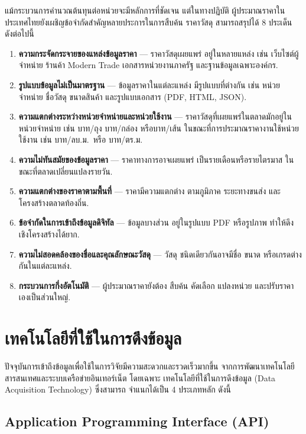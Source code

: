 แม้กระบวนการคำนวณต้นทุนต่อหน่วยจะมีหลักการที่ชัดเจน แต่ในทางปฏิบัติ
ผู้ประมาณราคาในประเทศไทยยังเผชิญข้อจำกัดสำคัญหลายประการในการสืบค้น
ราคาวัสดุ \cite{benchanakatkun2014,elmohr2022} สามารถสรุปได้ 8 ประเด็น
ดังต่อไปนี้

\begin{enumerate}[leftmargin=2em,itemsep=0.3em]
  \item \textbf{ความกระจัดกระจายของแหล่งข้อมูลราคา} --- ราคาวัสดุเผยแพร่
        อยู่ในหลายแหล่ง เช่น เว็บไซต์ผู้จำหน่าย ร้านค้า Modern Trade
        เอกสารหน่วยงานภาครัฐ และฐานข้อมูลเฉพาะองค์กร.
  \item \textbf{รูปแบบข้อมูลไม่เป็นมาตรฐาน} --- ข้อมูลราคาในแต่ละแหล่ง
        มีรูปแบบที่ต่างกัน เช่น หน่วยจำหน่าย ชื่อวัสดุ ขนาดสินค้า
        และรูปแบบเอกสาร (PDF, HTML, JSON).
  \item \textbf{ความแตกต่างระหว่างหน่วยจำหน่ายและหน่วยใช้งาน} ---
        ราคาวัสดุที่เผยแพร่ในตลาดมักอยู่ในหน่วยจำหน่าย เช่น บาท/ถุง
        บาท/กล่อง หรือบาท/เส้น ในขณะที่การประมาณราคางานใช้หน่วย
        ใช้งาน เช่น บาท/ลบ.ม.\ หรือ บาท/ตร.ม.
  \item \textbf{ความไม่ทันสมัยของข้อมูลราคา} --- ราคาทางการอาจเผยแพร่
        เป็นรายเดือนหรือรายไตรมาส ในขณะที่ตลาดเปลี่ยนแปลงรายวัน.
  \item \textbf{ความแตกต่างของราคาตามพื้นที่} --- ราคามีความแตกต่าง
        ตามภูมิภาค ระยะทางขนส่ง และโครงสร้างตลาดท้องถิ่น.
  \item \textbf{ข้อจำกัดในการเข้าถึงข้อมูลดิจิทัล} --- ข้อมูลบางส่วน
        อยู่ในรูปแบบ PDF หรือรูปภาพ ทำให้ดึงเชิงโครงสร้างได้ยาก.
  \item \textbf{ความไม่สอดคล้องของชื่อและคุณลักษณะวัสดุ} --- วัสดุ
        ชนิดเดียวกันอาจมีชื่อ ขนาด หรือเกรดต่างกันในแต่ละแหล่ง.
  \item \textbf{กระบวนการกึ่งอัตโนมัติ} --- ผู้ประมาณราคายังต้อง
        สืบค้น คัดเลือก แปลงหน่วย และปรับราคาเองเป็นส่วนใหญ่.
\end{enumerate}

\section{เทคโนโลยีที่ใช้ในการดึงข้อมูล}
\label{sec:tech}

ปัจจุบันการเข้าถึงข้อมูลเพื่อใช้ในการวิจัยมีความสะดวกและรวดเร็วมากขึ้น
จากการพัฒนาเทคโนโลยีสารสนเทศและระบบเครือข่ายอินเทอร์เน็ต โดยเฉพาะ
เทคโนโลยีที่ใช้ในการดึงข้อมูล (Data Acquisition Technology) ซึ่งสามารถ
จำแนกได้เป็น 4 ประเภทหลัก ดังนี้

\subsection{Application Programming Interface (API)}

